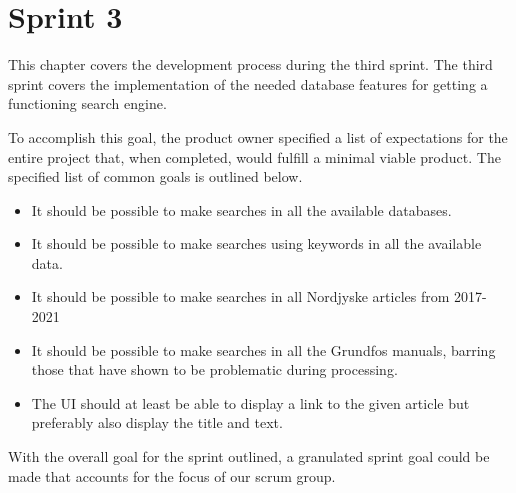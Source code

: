 \chapter{Sprint 3}

This chapter covers the development process during the third sprint. The third sprint covers the implementation of the needed database features for getting a functioning search engine. 


To accomplish this goal, the product owner specified a list of expectations for the entire \knox{} project that, when completed, would fulfill a minimal viable product. The specified list of common goals is outlined below.
\begin{itemize}
	\item It should be possible to make searches in all the available databases.
	\item It should be possible to make searches using keywords in all the available data.
	\item It should be possible to make searches in all Nordjyske articles from 2017-2021
	\item It should be possible to make searches in all the Grundfos manuals, barring those that have shown to be problematic during processing.
	\item The UI should at least be able to display a link to the given article but preferably also display the title and text.
\end{itemize}

With the overall goal for the sprint outlined, a granulated sprint goal could be made that accounts for the focus of our scrum group.





